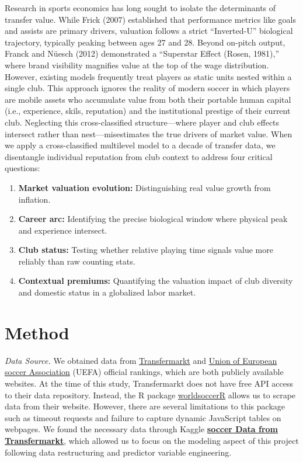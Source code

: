 \documentclass[
  12pt]{article}
\begin{document}
Research in sports economics has long sought to isolate the determinants
of transfer value. While Frick (2007) established that performance
metrics like goals and assists are primary drivers, valuation follows a
strict ``Inverted-U'' biological trajectory, typically peaking between
ages 27 and 28. Beyond on-pitch output, Franck and Nüesch (2012)
demonstrated a ``Superstar Effect (Rosen, 1981),'' where brand
visibility magnifies value at the top of the wage distribution. However,
existing models frequently treat players as static units nested within a
single club. This approach ignores the reality of modern soccer in which
players are mobile assets who accumulate value from both their portable
human capital (i.e., experience, skils, reputation) and the
institutional prestige of their current club. Neglecting this
cross-classified structure---where player and club effects intersect
rather than nest---misestimates the true drivers of market value. When
we apply a cross-classified multilevel model to a decade of transfer
data, we disentangle individual reputation from club context to address
four critical questions:

\begin{enumerate}
\def\labelenumi{\arabic{enumi}.}
\item
  \textbf{Market valuation evolution:} Distinguishing real value growth
  from inflation.
\item
  \textbf{Career arc:} Identifying the precise biological window where
  physical peak and experience intersect.
\item
  \textbf{Club status:} Testing whether relative playing time signals
  value more reliably than raw counting stats.
\item
  \textbf{Contextual premiums:} Quantifying the valuation impact of club
  diversity and domestic status in a globalized labor market.
\end{enumerate}

\section{Method}\label{method}

\emph{Data Source.} We obtained data from
\href{https://www.transfermarkt.com/}{Transfermarkt} and
\href{https://www.uefa.com/}{Union of European soccer Association}
(UEFA) official rankings, which are both publicly available websites. At
the time of this study, Transfermarkt does not have free API access to
their data repository. Instead, the R package
\href{https://jaseziv.github.io/worldfootballR/articles/load-scraped-data.html}{worldsoccerR}
allows us to scrape data from their website. However, there are several
limitations to this package such as timeout requests and failure to
capture dynamic JavaScript tables on webpages. We found the necessary
data through Kaggle
\href{https://www.kaggle.com/datasets/davidcariboo/player-scores?resource=download}{\textbf{soccer
Data from Transfermarkt}}, which allowed us to focus on the modeling
aspect of this project following data restructuring and predictor
variable engineering.
\end{document}

